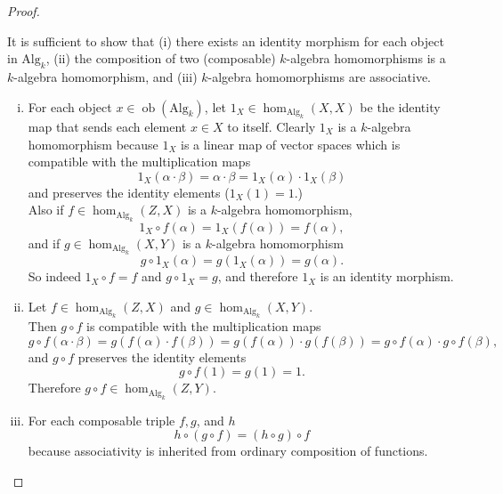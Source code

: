 \documentclass{article}
\newenvironment{problempart}[1]{\begin{trivlist}\item[\textbf{Part #1.}]}{\end{trivlist}}
\begin{document}
\begin{proof} \text{}\\
\begin{problempart}{(a)}
  It is sufficient to show that
  (i) there exists an identity morphism for each object in $\text{Alg}_k$,
  (ii) the composition of two (composable) $k$-algebra homomorphisms is a
    $k$-algebra homomorphism, and
  (iii) $k$-algebra homomorphisms are associative.
  \begin{enumerate}[(i)]
    \item For each object $x\in\operatorname{ob}(\text{Alg}_k)$, let
      $1_X \in \operatorname{hom}_{\text{Alg}_k}(X,X)$ be the
      identity map that sends each element $x \in X$ to itself.
      Clearly $1_X$ is a $k$-algebra homomorphism because $1_X$ is a linear map
      of vector spaces which is compatible with the multiplication maps \[
        1_X(\alpha \cdot \beta) = \alpha \cdot \beta
        = 1_X(\alpha) \cdot 1_X(\beta)
      \] and preserves the identity elements ($1_X(1) = 1.$)\\
      Also if $f \in \operatorname{hom}_{\text{Alg}_k}(Z,X)$ is a $k$-algebra
      homomorphism, \[
        1_X \circ f(\alpha) = 1_X(f(\alpha)) = f(\alpha),
      \] and if $g \in \operatorname{hom}_{\text{Alg}_k}(X,Y)$ is a $k$-algebra
      homomorphism \[
        g\circ 1_X(\alpha) = g(1_X(\alpha)) = g(\alpha).
      \] So indeed $1_X \circ f = f$ and $g \circ 1_X = g$, and therefore $1_X$
      is an identity morphism.
    \item Let
      $f \in \operatorname{hom}_{\text{Alg}_k}(Z,X)$ and
      $g \in \operatorname{hom}_{\text{Alg}_k}(X,Y)$.\\
      Then $g \circ f$ is compatible with the multiplication maps \[
        g \circ f(\alpha \cdot \beta) = g(f(\alpha) \cdot f(\beta))
        = g(f(\alpha)) \cdot g(f(\beta))
        = g\circ f(\alpha) \cdot g\circ f(\beta),
      \] and $g \circ f$ preserves the identity elements \[
        g\circ f(1) = g(1) = 1.
      \] Therefore $g \circ f \in \operatorname{hom}_{\text{Alg}_k}(Z,Y)$.
    \item For each composable triple $f, g$, and $h$ \[
    h \circ (g \circ f) = (h \circ g) \circ f
    \] because associativity is inherited from ordinary composition of functions.
  \end{enumerate}
\end{problempart}


\end{proof}
\end{document}
